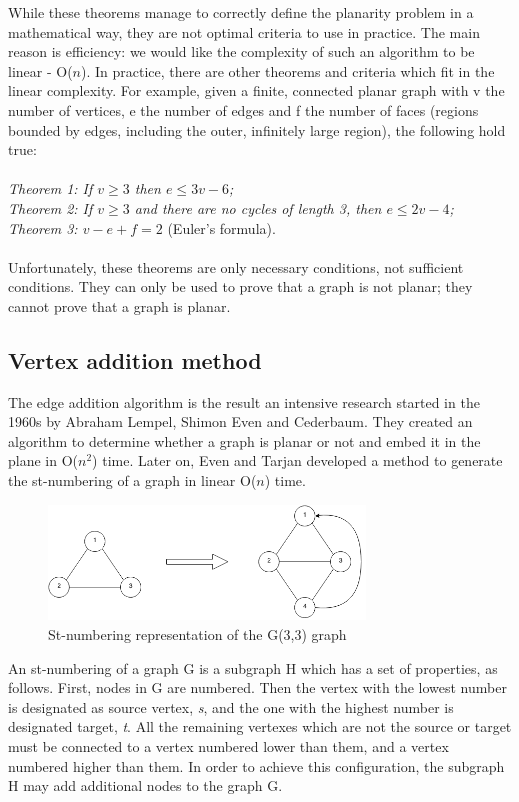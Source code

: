 While these theorems manage to correctly define the planarity problem in a mathematical way, they are not optimal 
criteria to use in practice. The main reason is efficiency: we would like the complexity of such an algorithm 
to be linear - O($n$). In practice, there are other theorems and criteria which fit in the linear complexity. For 
example, given a finite, connected planar graph with v the number of vertices, e the number of edges and 
f the number of faces (regions bounded by edges, including the outer, infinitely large region), the following 
hold true:
\\ 
\\ \textit{Theorem 1: If $v \geq 3$ then $e \leq 3v-6$;}
\\ \textit{Theorem 2: If $v \geq 3$ and there are no cycles of length 3, then $e \leq 2v-4$;}
\\ \textit{Theorem 3: $v - e + f = 2$} (Euler's formula).
\\ 
\\ Unfortunately, these theorems are only necessary conditions, not sufficient conditions. They can only be used to 
prove that a graph is not planar; they cannot prove that a graph is planar.

\subsection{Vertex addition method}

The edge addition algorithm is the result an intensive research started in the 1960s by Abraham Lempel, Shimon Even
and Cederbaum. They created an algorithm to determine whether a graph is planar or not and embed it in the plane in 
O($n^{2}$) time. Later on, Even and Tarjan developed a method to generate the st-numbering of a graph in linear O(${n}$) time.

\begin{figure}[ht] \centering
\includegraphics[width=0.75\textwidth]{img/algdesing/st_numbering.png}
\caption{St-numbering representation of the G(3,3) graph} \end{figure}

An st-numbering of a graph G is a subgraph H which has a set of properties, as follows. First, nodes in G are numbered. 
Then the vertex with the lowest number is designated as source vertex, \emph{s}, and the one with the highest number 
is designated target, \emph{t}. All the remaining vertexes which are not the source or target must be connected to a 
vertex numbered lower than them, and a vertex numbered higher than them. In order to achieve this configuration, the 
subgraph H may add additional nodes to the graph G.

